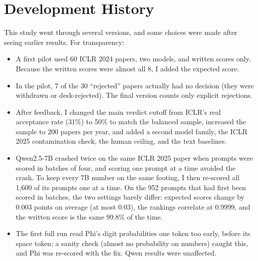 \documentclass[11pt]{article}
\begin{document}
\section{Development History}
\label{app:history}
This study went through several versions, and some choices were made after seeing earlier results. For transparency:
\begin{itemize}
  \item A first pilot used 60 ICLR 2024 papers, two models, and written scores only. Because the written scores were almost all 8, I added the expected score.
  \item In the pilot, 7 of the 30 ``rejected'' papers actually had no decision (they were withdrawn or desk-rejected). The final version counts only explicit rejections.
  \item After feedback, I changed the main verdict cutoff from ICLR's real acceptance rate (31\%) to 50\% to match the balanced sample, increased the sample to 200 papers per year, and added a second model family, the ICLR 2025 contamination check, the human ceiling, and the text baselines.
  \item Qwen2.5-7B crashed twice on the same ICLR 2025 paper when prompts were scored in batches of four, and scoring one prompt at a time avoided the crash. To keep every 7B number on the same footing, I then re-scored all 1,600 of its prompts one at a time. On the 952 prompts that had first been scored in batches, the two settings barely differ: expected scores change by 0.003 points on average (at most 0.03), the rankings correlate at 0.9999, and the written score is the same 99.8\% of the time.
  \item The first full run read Phi's digit probabilities one token too early, before its space token; a sanity check (almost no probability on numbers) caught this, and Phi was re-scored with the fix. Qwen results were unaffected.
\end{itemize}
\end{document}
